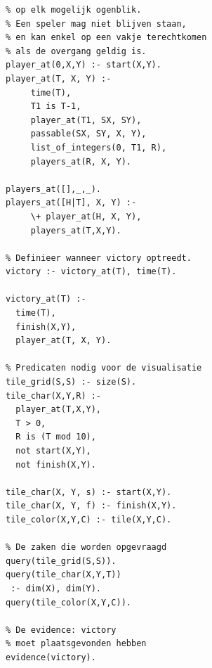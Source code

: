 \documentclass{article}
\begin{document}
\begin{lstlisting}[language=Prolog-pretty]
% Definieer de positie van de speler
% op elk mogelijk ogenblik.
% Een speler mag niet blijven staan,
% en kan enkel op een vakje terechtkomen
% als de overgang geldig is.
player_at(0,X,Y) :- start(X,Y).
player_at(T, X, Y) :-
     time(T),
     T1 is T-1,
     player_at(T1, SX, SY),
     passable(SX, SY, X, Y),
     list_of_integers(0, T1, R),
     players_at(R, X, Y).

players_at([],_,_).
players_at([H|T], X, Y) :-
     \+ player_at(H, X, Y),
     players_at(T,X,Y).

% Definieer wanneer victory optreedt.
victory :- victory_at(T), time(T).

victory_at(T) :-
  time(T),
  finish(X,Y),
  player_at(T, X, Y).

% Predicaten nodig voor de visualisatie
tile_grid(S,S) :- size(S).
tile_char(X,Y,R) :-
  player_at(T,X,Y),
  T > 0,
  R is (T mod 10),
  not start(X,Y),
  not finish(X,Y).

tile_char(X, Y, s) :- start(X,Y).
tile_char(X, Y, f) :- finish(X,Y).
tile_color(X,Y,C) :- tile(X,Y,C).

% De zaken die worden opgevraagd
query(tile_grid(S,S)).
query(tile_char(X,Y,T)) 
 :- dim(X), dim(Y).
query(tile_color(X,Y,C)).

% De evidence: victory
% moet plaatsgevonden hebben
evidence(victory).
\end{lstlisting}
\end{document}

